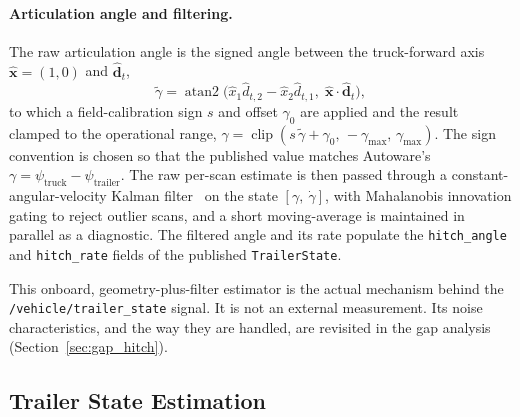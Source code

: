 \paragraph{Articulation angle and filtering.} The raw articulation angle is the signed angle between the truck-forward axis $\hat{\mathbf{x}} = (1, 0)$ and $\hat{\mathbf{d}}_t$,
\begin{equation}
    \tilde\gamma = \operatorname{atan2}\!\big(\hat{x}_1 \hat{d}_{t,2} - \hat{x}_2 \hat{d}_{t,1},\; \hat{\mathbf{x}} \cdot \hat{\mathbf{d}}_t\big),
    \label{eq:hitch_raw_angle}
\end{equation}
to which a field-calibration sign $s$ and offset $\gamma_0$ are applied and the result clamped to the operational range, $\gamma = \operatorname{clip}(s\,\tilde\gamma + \gamma_0,\, -\gamma_\text{max},\, \gamma_\text{max})$. The sign convention is chosen so that the published value matches Autoware's $\gamma = \psi_\text{truck} - \psi_\text{trailer}$. The raw per-scan estimate is then passed through a constant-angular-velocity Kalman filter~\cite{kalman1960new} on the state $[\gamma,\ \dot\gamma]$, with Mahalanobis innovation gating to reject outlier scans, and a short moving-average is maintained in parallel as a diagnostic. The filtered angle and its rate populate the \texttt{hitch\_angle} and \texttt{hitch\_rate} fields of the published \texttt{TrailerState}.

This onboard, geometry-plus-filter estimator is the actual mechanism behind the \texttt{/vehicle/trailer\_state} signal. It is not an external measurement. Its noise characteristics, and the way they are handled, are revisited in the gap analysis (Section~\ref{sec:gap_hitch}).

\subsection{Trailer State Estimation}

